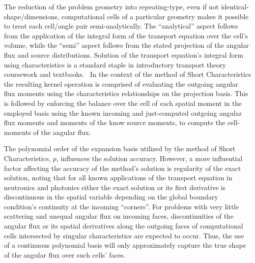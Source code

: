 The reduction of the problem geometry into repeating-type, even if not identical-shape/dimensions, computational cells of a particular geometry makes it possible to treat each cell/angle pair semi-analytically. The “analytical” aspect follows from the application of the integral form of the transport equation over the cell’s volume, while the “semi” aspect follows from the stated projection of the angular flux and source distributions. Solution of the transport equation’s integral form using characteristics is a standard staple in introductory transport theory coursework and textbooks.~\cite{Lewis1993} In the context of the method of Short Characteristics the resulting kernel operation is comprised of evaluating the outgoing angular flux moments using the characteristics relationships on the projection basis. This is followed by enforcing the balance over the cell of each spatial moment in the employed basis using the known incoming and just-computed outgoing angular flux moments and moments of the know source moments, to compute the cell-moments of the angular flux.~\cite{Sanchez1982}

The polynomial order of the expansion basis utilized by the method of Short Characteristics, $p$, influences the solution accuracy. However, a more influential factor affecting the accuracy of the method’s solution is regularity of the exact solution, noting that for all known applications of the transport equation in neutronics and photonics either the exact solution or its first derivative is discontinuous in the spatial variable depending on the global boundary condition’s continuity at the incoming “corners”. For problems with very little scattering and unequal angular flux on incoming faces, discontinuities of the angular flux or its spatial derivatives along the outgoing faces of computational cells intersected by singular characteristics are expected to occur. Thus, the use of a continuous polynomial basis will only approximately capture the true shape of the angular flux over such cells’ faces.
 
